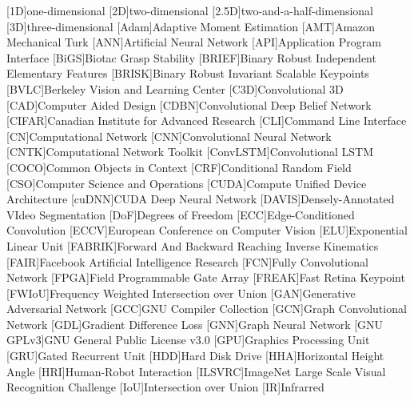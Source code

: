 \begin{acronym}
	[1D]{one-dimensional}
	[2D]{two-dimensional}
	[2.5D]{two-and-a-half-dimensional}
	[3D]{three-dimensional}
	[Adam]{Adaptive Moment Estimation}
	[AMT]{Amazon Mechanical Turk}
	[ANN]{Artificial Neural Network}
    [API]{Application Program Interface}
    [BiGS]{Biotac Grasp Stability}
	[BRIEF]{Binary Robust Independent Elementary Features}
	[BRISK]{Binary Robust Invariant Scalable Keypoints}
    [BVLC]{Berkeley Vision and Learning Center}
    [C3D]{Convolutional 3D}
	[CAD]{Computer Aided Design}
	[CDBN]{Convolutional Deep Belief Network}
	[CIFAR]{Canadian Institute for Advanced Research}
	[CLI]{Command Line Interface}
	[CN]{Computational Network}
	[CNN]{Convolutional Neural Network}
    [CNTK]{Computational Network Toolkit}
    [ConvLSTM]{Convolutional LSTM}
    [COCO]{Common Objects in Context}
    [CRF]{Conditional Random Field}
	[CSO]{Computer Science and Operations}
	[CUDA]{Compute Unified Device Architecture}
    [cuDNN]{CUDA Deep Neural Network}
    [DAVIS]{Densely-Annotated VIdeo Segmentation}
    [DoF]{Degrees of Freedom}
    [ECC]{Edge-Conditioned Convolution}
    [ECCV]{European Conference on Computer Vision}
    [ELU]{Exponential Linear Unit}
    [FABRIK]{Forward And Backward Reaching Inverse Kinematics}
    [FAIR]{Facebook Artificial Intelligence Research}
    [FCN]{Fully Convolutional Network}
    [FPGA]{Field Programmable Gate Array}
    [FREAK]{Fast Retina Keypoint}
    [FWIoU]{Frequency Weighted Intersection over Union}
    [GAN]{Generative Adversarial Network}
    [GCC]{GNU Compiler Collection}
    [GCN]{Graph Convolutional Network}
    [GDL]{Gradient Difference Loss}
    [GNN]{Graph Neural Network}
	[GNU GPLv3]{GNU General Public License v3.0}
    [GPU]{Graphics Processing Unit}
    [GRU]{Gated Recurrent Unit}
    [HDD]{Hard Disk Drive}
    [HHA]{Horizontal Height Angle}
    [HRI]{Human-Robot Interaction}
    [ILSVRC]{ImageNet Large Scale Visual Recognition Challenge}
    [IoU]{Intersection over Union}
	[IR]{Infrarred}

\end{acronym}
